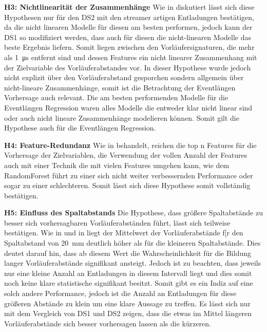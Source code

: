 \textbf{H3: Nichtlinearität der Zusammenhänge}\newline
Wie in  diskutiert lässt sich diese Hypothesen nur für den DS2 mit den streamer artigen Entladungen bestätigen, da die nicht linearen Modelle für diesen am besten performen, jedoch kann der DS1 so modifiziert werden, dass auch für diesen die nicht-linearen Modelle das beste Ergebnis liefern. Somit liegen zwischen den Vorläufersignaturen, die mehr als \SI{1}{\micro\second} entfernt sind und dessen Features ein nicht linearer Zusammenhang mit der Zielvariable des Vorläuferabstandes vor. In dieser Hypothese wurde jedoch nicht explizit über den Vorläuferabstand gesporchen sondern allgemein über nicht-lineare Zusammenhänge, somit ist die Betrachtung der Eventlängen Vorhersage auch relevant. Die am besten performenden Modelle für die Eventlängen Regression waren alles Modelle die entweder klar nicht linear sind oder auch nicht lineare Zusammenhänge modelieren können. Somit gilt die Hypothese auch für die Eventlängen Regression.



\textbf{H4: Feature-Redundanz}\newline
Wie in  behandelt, reichen die top n Features für die Vorhersage der Zielvariablen, die Verwendung der vollen Anzahl der Features auch mit einer Technik die mit vielen Features umgehen kann, wie dem RandomForest führt zu einer sich nicht weiter verbessernden Performance oder sogar zu einer schlechteren. Somit lässt sich diese Hypothese somit vollständig bestätigen.


\textbf{H5: Einfluss des Spaltabstands}\newline
Die Hypothese, dass größere Spaltabstände zu besser sich vorhersagbaren Vorläuferabständen führt, lässt sich teilweise bestätigen. Wie in  und in  liegt der Mittelwert der Vorläuferabstände f[r den Spaltabstand von \SI{20}{\milli\meter} deutlich höher als für die kleineren Spaltabstände. Dies deutet darauf hin, dass ab diesem Wert die Wahrscheinlichkeit für die Bildung langer Vorläuferabstände signifikant ansteigt. Jedoch ist zu beachten, dass jeweils nur eine kleine Anzahl an Entladungen in diesem Intervall liegt und dies somit noch keine klare statistische signifikant besitzt. Somit gibt es ein Indiz auf eine solch andere Performance, jedoch ist die Anzahl an Entladungen für diese größeren Abstände zu klein um eine klare Aussage zu treffen. Es lässt sich nur mit dem Vergleich von DS1 und DS2 zeigen, dass die etwas im Mittel längeren Vorläuferabstände sich besser vorhersagen lassen als die kürzeren.  

